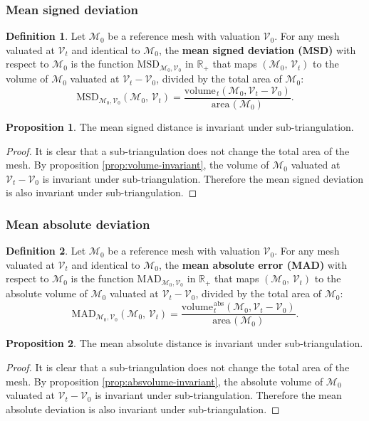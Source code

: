 \documentclass{article}
\theoremstyle{definition}
\newtheorem{defn}{Definition}
\newtheorem{prop}{Proposition}
\newcommand{\RR}{\mathbb{R}}
\newcommand{\MM}{\mathcal{M}}
\newcommand{\VV}{\mathcal{V}}
\newcommand{\area}{\mathrm{area}\hspace{1pt}}
\newcommand{\vol}{\mathrm{volume\hspace{1pt}}}
\newcommand{\absvol}{\mathrm{volume\hspace{1pt}}^\mathrm{abs}}
\begin{document}
\subsubsection{Mean signed deviation}
\begin{defn}
Let $\MM_0$ be a reference mesh with valuation $\VV_0$. For any mesh valuated at $\VV_t$ and identical to $\MM_0$, the \textbf{mean signed deviation (MSD)} with respect to $\MM_0$ is the function  $\mathrm{MSD}_{\MM_0,\VV_0}$ in $\RR_+$ that maps $(\MM_0,\,\VV_t)$ to the volume of $\MM_0$ valuated at $\VV_t-\VV_0$, divided by the total area of $\MM_0$:
\[\mathrm{MSD}_{\MM_0,\VV_0} (\MM_0,\,\VV_t) = \frac{\vol_t(\MM_0, \VV_t-\VV_0)}{\area(\MM_0)}.\]
\label{def:MSD}
\end{defn}
\begin{prop}
The mean signed distance is invariant under sub-triangulation.
\end{prop}
\begin{proof}[Proof]
It is clear that a sub-triangulation does not change the total area of the mesh.
By proposition \ref{prop:volume-invariant}, the volume of $\MM_0$ valuated at $\VV_t-\VV_0$ is invariant under sub-triangulation. Therefore the mean signed deviation is also invariant under sub-triangulation.
\end{proof}


\subsubsection{Mean absolute deviation}
\begin{defn}
Let $\MM_0$ be a reference mesh with valuation $\VV_0$. For any mesh valuated at $\VV_t$ and identical to $\MM_0$, the \textbf{mean absolute error (MAD)} with respect to $\MM_0$ is the function  $\mathrm{MAD}_{\MM_0,\VV_0}$ in $\RR_+$ that maps $(\MM_0,\,\VV_t)$ to the absolute volume of $\MM_0$ valuated at $\VV_t-\VV_0$, divided by the total area of $\MM_0$:
\[\mathrm{MAD}_{\MM_0,\VV_0} (\MM_0,\,\VV_t) = \frac{\absvol_t(\MM_0, \VV_t-\VV_0)}{\area(\MM_0)}.\]
\end{defn}

\begin{prop}
The mean absolute distance is invariant under sub-triangulation.
\end{prop}
\begin{proof}[Proof]
It is clear that a sub-triangulation does not change the total area of the mesh.
By proposition \ref{prop:absvolume-invariant}, the absolute volume of $\MM_0$ valuated at $\VV_t-\VV_0$ is invariant under sub-triangulation. Therefore the mean absolute deviation is also invariant under sub-triangulation.
\end{proof}
\end{document}
